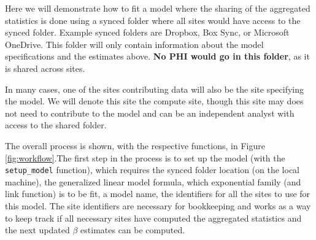 \documentclass[]{elsarticle} %
\begin{document}
Here we will demonstrate how to fit a model where the sharing of the aggregated statistics is done using a synced folder where all sites would have access to the synced folder. Example synced folders are Dropbox, Box Sync, or Microsoft OneDrive. This folder will only contain information about the model specifications and the estimates above. \textbf{No PHI would go in this folder}, as it is shared across sites.

In many cases, one of the sites contributing data will also be the site specifying the model. We will denote this site the compute site, though this site may does not need to contribute to the model and can be an independent analyst with access to the shared folder.

The overall process is shown, with the respective functions, in Figure \ref{fig:workflow}.The first step in the process is to set up the model (with the \texttt{setup\_model} function), which requires the synced folder location (on the local machine), the generalized linear model formula, which exponential family (and link function) is to be fit, a model name, the identifiers for all the sites to use for this model. The site identifiers are necessary for bookkeeping and works as a way to keep track if all necessary sites have computed the aggregated statistics and the next updated \(\beta\) estimates can be computed.
\end{document}
